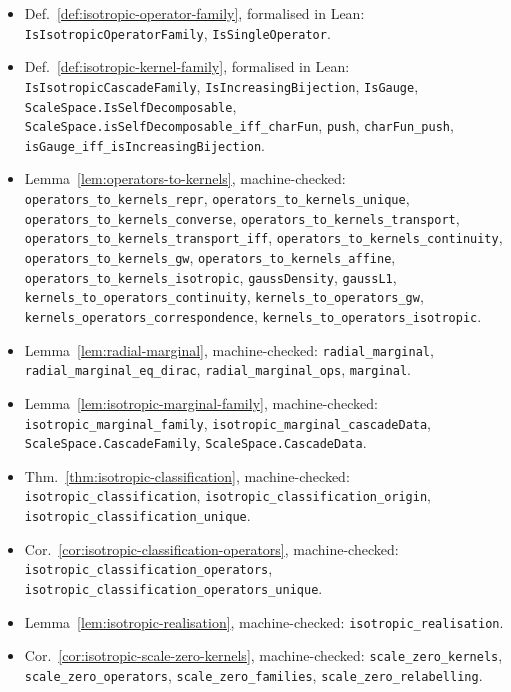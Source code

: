 {\footnotesize\raggedright
\begin{itemize}
\setlength{\itemsep}{1pt}\setlength{\parskip}{0pt}
\item Def.~\ref{def:isotropic-operator-family}, formalised in Lean:
  \texttt{IsIsotropicOperatorFamily}, \texttt{IsSingleOperator}.
\item Def.~\ref{def:isotropic-kernel-family}, formalised in Lean:
  \texttt{IsIsotropicCascadeFamily}, \texttt{IsIncreasingBijection}, \texttt{IsGauge}, \texttt{ScaleSpace.IsSelfDecomposable}, \texttt{ScaleSpace.isSelfDecomposable\_iff\_charFun}, \texttt{push}, \texttt{charFun\_push}, \texttt{isGauge\_iff\_isIncreasingBijection}.
\item Lemma~\ref{lem:operators-to-kernels}, machine-checked:
  \texttt{operators\_to\_kernels\_repr}, \texttt{operators\_to\_kernels\_unique}, \texttt{operators\_to\_kernels\_converse}, \texttt{operators\_to\_kernels\_transport}, \texttt{operators\_to\_kernels\_transport\_iff}, \texttt{operators\_to\_kernels\_continuity}, \texttt{operators\_to\_kernels\_gw}, \texttt{operators\_to\_kernels\_affine}, \texttt{operators\_to\_kernels\_isotropic}, \texttt{gaussDensity}, \texttt{gaussL1}, \texttt{kernels\_to\_operators\_continuity}, \texttt{kernels\_to\_operators\_gw}, \texttt{kernels\_operators\_correspondence}, \texttt{kernels\_to\_operators\_isotropic}.
\item Lemma~\ref{lem:radial-marginal}, machine-checked:
  \texttt{radial\_marginal}, \texttt{radial\_marginal\_eq\_dirac}, \texttt{radial\_marginal\_ops}, \texttt{marginal}.
\item Lemma~\ref{lem:isotropic-marginal-family}, machine-checked:
  \texttt{isotropic\_marginal\_family}, \texttt{isotropic\_marginal\_cascadeData}, \texttt{ScaleSpace.CascadeFamily}, \texttt{ScaleSpace.CascadeData}.
\item Thm.~\ref{thm:isotropic-classification}, machine-checked:
  \texttt{isotropic\_classification}, \texttt{isotropic\_classification\_origin}, \texttt{isotropic\_classification\_unique}.
\item Cor.~\ref{cor:isotropic-classification-operators}, machine-checked:
  \texttt{isotropic\_classification\_operators}, \texttt{isotropic\_classification\_operators\_unique}.
\item Lemma~\ref{lem:isotropic-realisation}, machine-checked:
  \texttt{isotropic\_realisation}.
\item Cor.~\ref{cor:isotropic-scale-zero-kernels}, machine-checked:
  \texttt{scale\_zero\_kernels}, \texttt{scale\_zero\_operators}, \texttt{scale\_zero\_families}, \texttt{scale\_zero\_relabelling}.

\end{itemize}}
